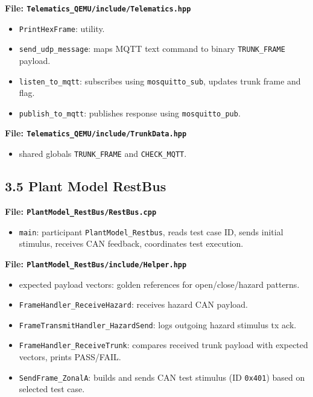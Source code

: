 \documentclass[11pt,a4paper]{article}
\begin{document}
\textbf{File: \texttt{Telematics\_QEMU/include/Telematics.hpp}}
\begin{itemize}
  \item \texttt{PrintHexFrame}: utility.
  \item \texttt{send\_udp\_message}: maps MQTT text command to binary \texttt{TRUNK\_FRAME} payload.
  \item \texttt{listen\_to\_mqtt}: subscribes using \texttt{mosquitto\_sub}, updates trunk frame and flag.
  \item \texttt{publish\_to\_mqtt}: publishes response using \texttt{mosquitto\_pub}.
\end{itemize}

\textbf{File: \texttt{Telematics\_QEMU/include/TrunkData.hpp}}
\begin{itemize}
  \item shared globals \texttt{TRUNK\_FRAME} and \texttt{CHECK\_MQTT}.
\end{itemize}

\subsection*{3.5 Plant Model RestBus}
\textbf{File: \texttt{PlantModel\_RestBus/RestBus.cpp}}
\begin{itemize}
  \item \texttt{main}: participant \texttt{PlantModel\_Restbus}, reads test case ID, sends initial stimulus, receives CAN feedback, coordinates test execution.
\end{itemize}

\textbf{File: \texttt{PlantModel\_RestBus/include/Helper.hpp}}
\begin{itemize}
  \item expected payload vectors: golden references for open/close/hazard patterns.
  \item \texttt{FrameHandler\_ReceiveHazard}: receives hazard CAN payload.
  \item \texttt{FrameTransmitHandler\_HazardSend}: logs outgoing hazard stimulus tx ack.
  \item \texttt{FrameHandler\_ReceiveTrunk}: compares received trunk payload with expected vectors, prints PASS/FAIL.
  \item \texttt{SendFrame\_ZonalA}: builds and sends CAN test stimulus (ID \texttt{0x401}) based on selected test case.
\end{itemize}
\end{document}
